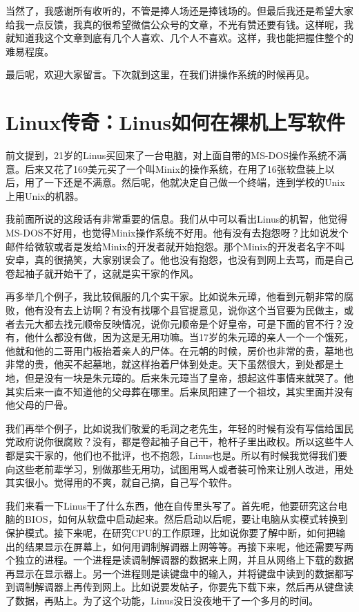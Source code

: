 \documentclass[
  letterpaper,
  DIV=11,
  numbers=noendperiod]{scrreprt}
\begin{document}
当然了，我感谢所有收听的，不管是捧人场还是捧钱场的。但最后我还是希望大家给我一点反馈，我真的很希望微信公众号的文章，不光有赞还要有钱。这样呢，我就知道我这个文章到底有几个人喜欢、几个人不喜欢。这样，我也能把握住整个的难易程度。

最后呢，欢迎大家留言。下次就到这里，在我们讲操作系统的时候再见。


\chapter{Linux传奇：Linus如何在裸机上写软件}\label{linuxux4f20ux5947linusux5982ux4f55ux5728ux88f8ux673aux4e0aux5199ux8f6fux4ef6}

前文提到，21岁的Linus买回来了一台电脑，对上面自带的MS-DOS操作系统不满意。后来又花了169美元买了一个叫Minix的操作系统，在用了16张软盘装上以后，用了一下还是不满意。然后呢，他就决定自己做一个终端，连到学校的Unix上用Unix的机器。

我前面所说的这段话有非常重要的信息。我们从中可以看出Linus的机智，他觉得MS-DOS不好用，也觉得Minix操作系统不好用。他有没有去抱怨呀？比如说发个邮件给微软或者是发给Minix的开发者就开始抱怨。那个Minix的开发者名字不叫安卓，真的很搞笑，大家别误会了。他也没有抱怨，也没有到网上去骂，而是自己卷起袖子就开始干了，这就是实干家的作风。

再多举几个例子，我比较佩服的几个实干家。比如说朱元璋，他看到元朝非常的腐败，他有没有去上访啊？有没有找哪个县官提意见，说你这个当官要为民做主，或者去元大都去找元顺帝反映情况，说你元顺帝是个好皇帝，可是下面的官不行？没有，他什么都没有做，因为这是无用功嘛。当17岁的朱元璋的亲人一个一个饿死，他就和他的二哥用门板抬着亲人的尸体。在元朝的时候，房价也非常的贵，墓地也非常的贵，他买不起墓地，就这样抬着尸体到处走。天下虽然很大，到处都是土地，但是没有一块是朱元璋的。后来朱元璋当了皇帝，想起这件事情来就哭了。他其实后来一直不知道他的父母葬在哪里。后来凤阳建了一个祖坟，其实里面并没有他父母的尸骨。

我们再举个例子，比如说我们敬爱的毛润之老先生，年轻的时候有没有写信给国民党政府说你很腐败？没有，都是卷起袖子自己干，枪杆子里出政权。所以这些牛人都是实干家的，他们也不批评，也不抱怨，Linus也是。所以有时候我觉得我们要向这些老前辈学习，别做那些无用功，试图用骂人或者装可怜来让别人改进，用处其实很小。觉得用的不爽，就自己搞，自己写个软件。

我们来看一下Linus干了什么东西，他在自传里头写了。首先呢，他要研究这台电脑的BIOS，如何从软盘中启动起来。然后启动以后呢，要让电脑从实模式转换到保护模式。接下来呢，在研究CPU的工作原理，比如说你要了解中断，如何把输出的结果显示在屏幕上，如何用调制解调器上网等等。再接下来呢，他还需要写两个独立的进程。一个进程是读调制解调器的数据来上网，并且从网络上下载的数据再显示在显示器上。另一个进程则是读键盘中的输入，并将键盘中读到的数据都写到调制解调器上再传到网上。比如说要发帖子，你要先下载下来，然后再从键盘读了数据，再贴上。为了这个功能，Linus没日没夜地干了一个多月的时间。
\end{document}
